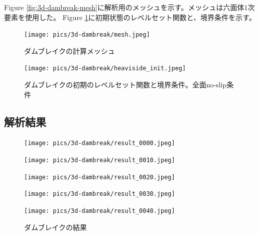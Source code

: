 Figure \ref{fig:3d-dambreak-mesh}に解析用のメッシュを示す。メッシュは六面体$1$次要素を使用した。
Figure \ref{fig:3d-dambreak-boundary}に初期状態のレベルセット関数と、境界条件を示す。

\begin{figure}[H]
	\centering
	\begin{minipage}[b]{0.49\columnwidth}
	    \centering
		\texttt{[image: pics/3d-dambreak/mesh.jpeg]}
		\caption{ダムブレイクの計算メッシュ}
		\label{fig:3d-dambreak-mesh}
	\end{minipage}
	\begin{minipage}[b]{0.49\columnwidth}
	    \centering
		\texttt{[image: pics/3d-dambreak/heaviside\_init.jpeg]}
		\caption{ダムブレイクの初期のレベルセット関数と境界条件。全面no-slip条件}
		\label{fig:3d-dambreak-boundary}
	\end{minipage}
\end{figure}

\newpage
\subsection{解析結果}

\begin{figure}[H]
	\centering
	\begin{minipage}[b]{0.19\columnwidth}
	    \centering
	    \texttt{[image: pics/3d-dambreak/result\_0000.jpeg]}
	\end{minipage}
	\begin{minipage}[b]{0.19\columnwidth}
	    \centering
	    \texttt{[image: pics/3d-dambreak/result\_0010.jpeg]}
	\end{minipage}
	\begin{minipage}[b]{0.19\columnwidth}
	    \centering
	    \texttt{[image: pics/3d-dambreak/result\_0020.jpeg]}
	\end{minipage}
	\begin{minipage}[b]{0.19\columnwidth}
	    \centering
	    \texttt{[image: pics/3d-dambreak/result\_0030.jpeg]}
	\end{minipage}
	\begin{minipage}[b]{0.19\columnwidth}
	    \centering
	    \texttt{[image: pics/3d-dambreak/result\_0040.jpeg]}
	\end{minipage}

	\caption{ダムブレイクの結果}
	\label{fig:dambreak-result}
\end{figure}

